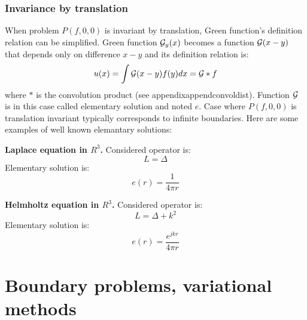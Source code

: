 \documentclass[12pt]{book}
\begin{document}
\subsubsection{Invariance by translation}
When problem $P(f,0,0)$ 
is invariant by translation, Green function's definition relation can be
simplified. Green function ${\cal G}_y(x)$ becomes a function ${\cal
  G}(x-y)$ that depends
only on difference $x-y$ and its definition relation is:
\begin{equation}
u(x)=\int {\cal G}(x-y)f(y)dx={\cal G}*f
\end{equation}
where $*$ is the convolution product (see appendix{appendconvoldist}). Function ${\cal G}$ is in this case called
elementary solution and noted $e$.
Case where $P(f,0,0)$ is translation invariant typically corresponds to
infinite boundaries\cite{ma:distr:Schwartz65}. 
Here are some examples of well known elemantary solutions:
\begin{exmp}
{\bf Laplace equation in $R^3$.} Considered operator is:
\begin{equation}
L=\Delta
\end{equation}
Elementary solution is:
\begin{equation}
e(r)=\frac{1}{4\pi r}
\end{equation}
\end{exmp}
\begin{exmp}
{\bf Helmholtz equation in $R^3$.} Considered operator is: 
\begin{equation}
L=\Delta+k^2
\end{equation}
Elementary solution is:
\begin{equation}
e(r)=\frac{e^{jkr}}{4\pi r}
\end{equation}
\end{exmp}



\section{Boundary problems, variational methods}\label{chapmetvar}
\end{document}
